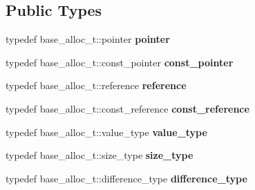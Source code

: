 \subsection*{Public Types}
\begin{DoxyCompactItemize}
\item 
\hypertarget{classstatic__shared__counting__allocator_a7db1e70b7c719f6081b5f87b4f0759d4}{}typedef base\+\_\+alloc\+\_\+t\+::pointer {\bfseries pointer}\label{classstatic__shared__counting__allocator_a7db1e70b7c719f6081b5f87b4f0759d4}

\item 
\hypertarget{classstatic__shared__counting__allocator_a190699786ae1521cc4c8e6447c2b84a8}{}typedef base\+\_\+alloc\+\_\+t\+::const\+\_\+pointer {\bfseries const\+\_\+pointer}\label{classstatic__shared__counting__allocator_a190699786ae1521cc4c8e6447c2b84a8}

\item 
\hypertarget{classstatic__shared__counting__allocator_ab772c85cde37958542a0adb0478a62b3}{}typedef base\+\_\+alloc\+\_\+t\+::reference {\bfseries reference}\label{classstatic__shared__counting__allocator_ab772c85cde37958542a0adb0478a62b3}

\item 
\hypertarget{classstatic__shared__counting__allocator_ade8fb226a1b7f71dae66d69e64cdfdcc}{}typedef base\+\_\+alloc\+\_\+t\+::const\+\_\+reference {\bfseries const\+\_\+reference}\label{classstatic__shared__counting__allocator_ade8fb226a1b7f71dae66d69e64cdfdcc}

\item 
\hypertarget{classstatic__shared__counting__allocator_a0f1b68fde91c8ecc2f5918799f216d3f}{}typedef base\+\_\+alloc\+\_\+t\+::value\+\_\+type {\bfseries value\+\_\+type}\label{classstatic__shared__counting__allocator_a0f1b68fde91c8ecc2f5918799f216d3f}

\item 
\hypertarget{classstatic__shared__counting__allocator_addaae0789f11482872f402ef046b2a35}{}typedef base\+\_\+alloc\+\_\+t\+::size\+\_\+type {\bfseries size\+\_\+type}\label{classstatic__shared__counting__allocator_addaae0789f11482872f402ef046b2a35}

\item 
\hypertarget{classstatic__shared__counting__allocator_a47fe243b55c48e297ea555b65ff14b0d}{}typedef base\+\_\+alloc\+\_\+t\+::difference\+\_\+type {\bfseries difference\+\_\+type}\label{classstatic__shared__counting__allocator_a47fe243b55c48e297ea555b65ff14b0d}

\end{DoxyCompactItemize}
